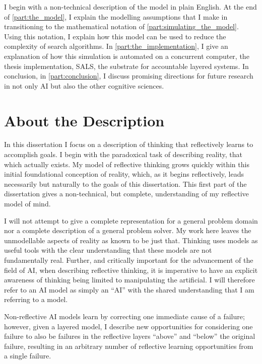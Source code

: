 I begin with a non-technical description of the model in plain
English.  At the end of \autoref{part:the_model}, I explain the
modelling assumptions that I make in transitioning to the mathematical
notation of \autoref{part:simulating_the_model}.  Using this notation,
I explain how this model can be used to reduce the complexity of
search algorithms.  In \autoref{part:the_implementation}, I give an
explanation of how this simulation is automated on a concurrent
computer, the thesis implementation, SALS, the substrate for
accountable layered systems.  In conclusion, in
\autoref{part:conclusion}, I discuss promising directions for future
research in not only AI but also the other cognitive sciences.

\section{About the Description}

In this dissertation I focus on a description of thinking that
reflectively learns to accomplish goals.  I begin with the paradoxical
task of describing reality, that which actually exists.  My model of
reflective thinking grows quickly within this initial foundational
conception of reality, which, as it begins reflectively, leads
necessarily but naturally to the goals of this dissertation.  This
first part of the dissertation gives a non-technical, but complete,
understanding of my reflective model of mind.

I will not attempt to give a complete representation for a general
problem domain nor a complete description of a general problem solver.
My work here leaves the unmodellable aspects of reality as known to be
just that.  Thinking uses models as useful tools with the clear
understanding that these models are not fundamentally real.  Further,
and critically important for the advancement of the field of AI, when
describing reflective thinking, it is imperative to have an explicit
awareness of thinking being limited to manipulating the artificial.  I
will therefore refer to an AI model as simply an ``AI'' with the
shared understanding that I am referring to a model.

Non-reflective AI models learn by correcting one immediate cause of a
failure; however, given a layered model, I describe new opportunities
for considering one failure to also be failures in the reflective
layers ``above'' and ``below'' the original failure, resulting in an
arbitrary number of reflective learning opportunities from a single
failure.

